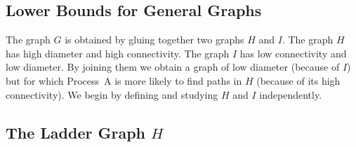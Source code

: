 \documentclass[lotsofwhite]{patmorin}
\begin{document}
%
%

\subsection{Lower Bounds for General Graphs}

The graph $G$ is obtained by gluing together two graphs $H$ and $I$.
The graph $H$ has high diameter and high connectivity.  The graph $I$
has low connectivity and low diameter.  By joining them we obtain a graph
of low diameter (because of $I$) but for which Process~A is more likely
to find paths in $H$ (because of its high connectivity).  We begin by
defining and studying $H$ and $I$ independently.


\subsection{The Ladder Graph $H$}
\end{document}
